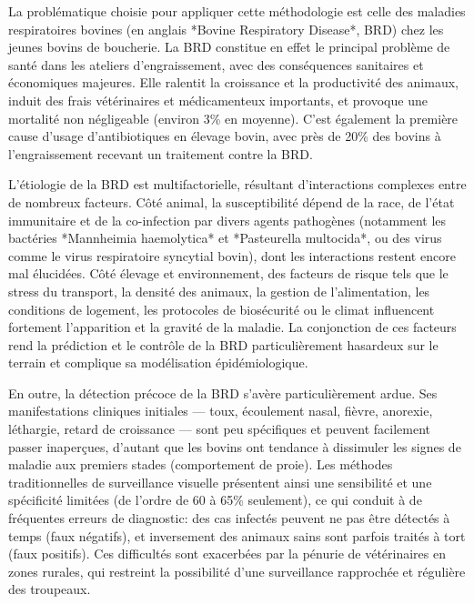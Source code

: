 La problématique choisie pour appliquer cette méthodologie est celle des maladies respiratoires bovines (en anglais *Bovine Respiratory Disease*, BRD) chez les jeunes bovins de boucherie. La BRD constitue en effet le principal problème de santé dans les ateliers d’engraissement, avec des conséquences sanitaires et économiques majeures. Elle ralentit la croissance et la productivité des animaux, induit des frais vétérinaires et médicamenteux importants, et provoque une mortalité non négligeable (environ 3\% en moyenne). C’est également la première cause d’usage d’antibiotiques en élevage bovin, avec près de 20\% des bovins à l’engraissement recevant un traitement contre la BRD. 

L’étiologie de la BRD est multifactorielle, résultant d’interactions complexes entre de nombreux facteurs. Côté animal, la susceptibilité dépend de la race, de l’état immunitaire et de la co-infection par divers agents pathogènes (notamment les bactéries *Mannheimia haemolytica* et *Pasteurella multocida*, ou des virus comme le virus respiratoire syncytial bovin), dont les interactions restent encore mal élucidées. Côté élevage et environnement, des facteurs de risque tels que le stress du transport, la densité des animaux, la gestion de l’alimentation, les conditions de logement, les protocoles de biosécurité ou le climat influencent fortement l’apparition et la gravité de la maladie. La conjonction de ces facteurs rend la prédiction et le contrôle de la BRD particulièrement hasardeux sur le terrain et complique sa modélisation épidémiologique. 

En outre, la détection précoce de la BRD s’avère particulièrement ardue. Ses manifestations cliniques initiales — toux, écoulement nasal, fièvre, anorexie, léthargie, retard de croissance — sont peu spécifiques et peuvent facilement passer inaperçues, d’autant que les bovins ont tendance à dissimuler les signes de maladie aux premiers stades (comportement de proie). Les méthodes traditionnelles de surveillance visuelle présentent ainsi une sensibilité et une spécificité limitées (de l’ordre de 60 à 65\% seulement), ce qui conduit à de fréquentes erreurs de diagnostic: des cas infectés peuvent ne pas être détectés à temps (faux négatifs), et inversement des animaux sains sont parfois traités à tort (faux positifs). Ces difficultés sont exacerbées par la pénurie de vétérinaires en zones rurales, qui restreint la possibilité d’une surveillance rapprochée et régulière des troupeaux.

